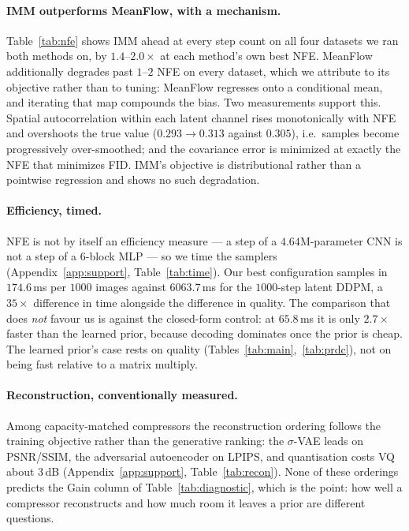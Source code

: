 \documentclass[sigconf,nonacm]{acmart}
\begin{document}
\paragraph{IMM outperforms MeanFlow, with a mechanism.}
Table~\ref{tab:nfe} shows IMM ahead at every step count on all four datasets
we ran both methods on, by $1.4$--$2.0\times$ at each method's own best NFE. MeanFlow additionally
degrades past $1$--$2$ NFE on every dataset, which we attribute to its
objective rather than to tuning: MeanFlow regresses onto a conditional mean, and iterating that map
compounds the bias. Two measurements support this. Spatial autocorrelation
within each latent channel rises monotonically with NFE and overshoots the
true value ($0.293 \to 0.313$ against $0.305$), i.e.\ samples become
progressively over-smoothed; and the covariance error is minimized at exactly
the NFE that minimizes FID. IMM's objective is distributional rather than a
pointwise regression and shows no such degradation.

\paragraph{Efficiency, timed.}
NFE is not by itself an efficiency measure --- a step of a $4.64$M-parameter CNN
is not a step of a 6-block MLP --- so we time the samplers
(Appendix~\ref{app:support}, Table~\ref{tab:time}). Our best configuration
samples in $174.6$\,ms per $1000$ images against $6063.7$\,ms for the
$1000$-step latent DDPM, a $35\times$ difference in time alongside the
difference in quality. The comparison that does \emph{not} favour us is against
the closed-form control: at $65.8$\,ms it is only $2.7\times$ faster than the
learned prior, because decoding dominates once the prior is cheap. The learned
prior's case rests on quality (Tables~\ref{tab:main},~\ref{tab:prdc}), not on
being fast relative to a matrix multiply.

\paragraph{Reconstruction, conventionally measured.}
Among capacity-matched compressors the reconstruction ordering follows the
training objective rather than the generative ranking: the $\sigma$-VAE leads on
PSNR/SSIM, the adversarial autoencoder on LPIPS, and quantisation costs VQ about
$3$\,dB (Appendix~\ref{app:support}, Table~\ref{tab:recon}). None of these
orderings predicts the Gain column of Table~\ref{tab:diagnostic}, which is the
point: how well a compressor reconstructs and how much room it leaves a prior
are different questions.
\end{document}
